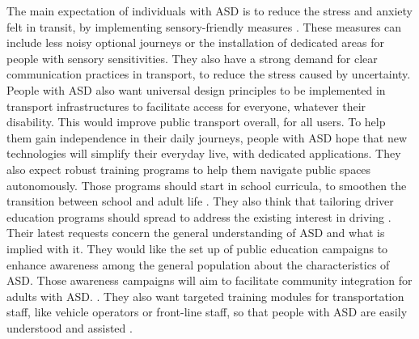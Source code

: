     The main expectation of individuals with ASD is to reduce the stress and anxiety felt in transit, by implementing sensory-friendly measures \cite{haas_experiences_nodate}. These measures can include  less noisy optional journeys or the installation of dedicated areas for people with sensory sensitivities. They also have a strong demand for clear communication practices in transport, to reduce the stress caused by uncertainty.
    \newline
    \newline
    People with ASD also want universal design principles to be implemented in transport infrastructures \cite{haas_experiences_nodate} to facilitate access for everyone, whatever their disability. This would improve public transport overall, for all users.
    \newline
    \newline
    To help them gain independence in their daily journeys, people with ASD hope that new technologies will simplify their everyday live, with dedicated applications. They also expect robust training programs to help them navigate public spaces autonomously. Those programs should start in school curricula, to smoothen the transition between school and adult life \cite{deka_co-principal_nodate}. They also think that tailoring driver education programs should spread to address the existing interest in driving \cite{deka_co-principal_nodate}. 
    \newline
    \newline
    Their latest requests concern the general understanding of ASD and what is implied with it. They would like the set up of public education campaigns to enhance awareness among the general population about the characteristics of ASD. Those awareness campaigns will aim to facilitate community integration for adults with ASD. \cite{deka_co-principal_nodate}. They also want targeted training modules for transportation staff, like vehicle operators or front-line staff, so that people with ASD are easily understood and assisted \cite{haas_experiences_nodate}. 
\newline
